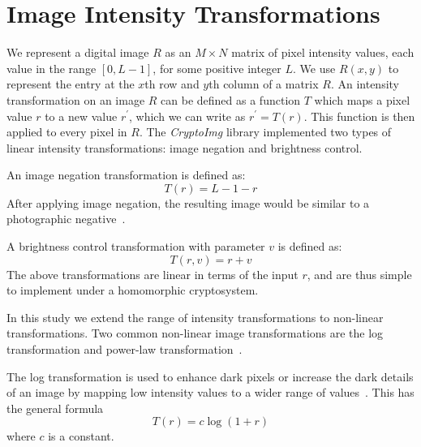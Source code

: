 
\section{Image Intensity Transformations}
We represent a digital image $R$ as an $M \times N$ matrix of pixel intensity values, each value in the range $\left[0, L-1\right]$, for some positive integer $L$. We use $R(x,y)$ to represent the entry at the $x$th row and $y$th column of a matrix $R$.
An intensity transformation on an image $R$ can be defined as a function $T$ which maps a pixel value $r$ to a new value $r^\prime$, which we can write as $r^\prime = T\left(r\right)$. This function is then applied to every pixel in $R$.
The \textit{CryptoImg} library implemented two types of linear intensity transformations: image negation and brightness control.

An image negation transformation is defined as:
\begin{equation}
    T\left(r\right) = L-1-r
\end{equation}
After applying image negation, the resulting image would be similar to a photographic negative~\cite{gonzalez_digital_2008}.

A brightness control transformation with parameter $v$ is defined as:
\begin{equation}
    T\left(r,v\right) = r+v
\end{equation}
The above transformations are linear in terms of the input $r$, and are thus simple to implement under a homomorphic cryptosystem.

In this study we extend the range of intensity transformations to non-linear transformations. Two common non-linear image transformations are the log transformation and power-law transformation~\cite{gonzalez_digital_2008}.

The log transformation is used to enhance dark pixels or increase the dark details of an image by mapping low intensity values to a wider range of values~\cite{gonzalez_digital_2008}. This has the general formula
\begin{equation}
    T\left(r\right) = c \log\left(1 + r\right)
\end{equation}
where $c$ is a constant.

